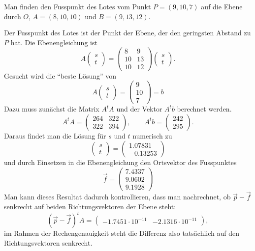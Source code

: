\begin{beispiel}
Man finden den Fusspunkt des Lotes vom Punkt $P=(9,10,7)$ auf die Ebene
durch $O$, $A=(8,10,10)$ und $B=(9,13,12)$.

Der Fusspunkt des Lotes ist der Punkt der Ebene, der den geringsten
Abstand zu $P$ hat.
Die Ebenengleichung ist
\[
A\begin{pmatrix}s\\t\end{pmatrix}=
\begin{pmatrix}
 8& 9\\
10&13\\
10&12
\end{pmatrix}
\begin{pmatrix}s\\t\end{pmatrix}.
\]
Gesucht wird die ``beste Lösung'' von
\[
A\begin{pmatrix}s\\t\end{pmatrix}=\begin{pmatrix}9\\10\\7\end{pmatrix}=b
\]
Dazu muss zunächst die Matrix $A^tA$ und der Vektor $A^tb$
berechnet werden.
\[
A^tA=\begin{pmatrix}
264&322\\
322&394
\end{pmatrix}
,\qquad
A^tb=\begin{pmatrix}
242\\295
\end{pmatrix}.
\]
Daraus findet man die Lösung für $s$ und $t$ numerisch zu
\[
\begin{pmatrix}s\\t \end{pmatrix}
=
\begin{pmatrix}
   1.07831\\
  -0.13253
\end{pmatrix}
\]
und durch Einsetzen in die Ebenengleichung den Ortsvektor des Fusspunktes
\[
\vec f = \begin{pmatrix}
   7.4337\\
   9.0602\\
   9.1928
\end{pmatrix}
\]
Man kann dieses Resultat dadurch kontrollieren, dass man nachrechnet, ob
$\vec p-\vec f$ senkrecht auf beiden Richtungsvektoren der Ebene
steht:
\[
(\vec p-\vec f)^tA=\begin{pmatrix}
  -1.7451\cdot10^{-11}&  -2.1316\cdot 10^{-11}
\end{pmatrix},
\]
im Rahmen der Rechengenauigkeit steht die Differenz also tatsächlich auf
den Richtungsvektoren senkrecht.
\end{beispiel}

